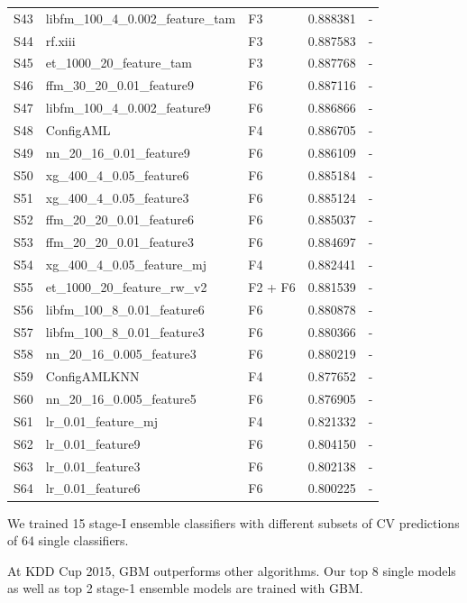\begin{table}[t]
\begin{center}
\begin{tabular}{lllll}
S43	& libfm\_100\_4\_0.002\_feature\_tam	& F3				& 0.888381	& - \\
S44	& rf.xiii				& F3							& 0.887583	& - \\
S45	& et\_1000\_20\_feature\_tam	& F3						& 0.887768	& - \\
S46 	& ffm\_30\_20\_0.01\_feature9	& F6						& 0.887116	& - \\
S47	& libfm\_100\_4\_0.002\_feature9	& F6					& 0.886866	& - \\
S48	& ConfigAML			& F4							& 0.886705	& - \\
S49	& nn\_20\_16\_0.01\_feature9	& F6						& 0.886109	& - \\
S50 	& xg\_400\_4\_0.05\_feature6	& F6						& 0.885184	& - \\
S51 	& xg\_400\_4\_0.05\_feature3	& F6						& 0.885124	& - \\
S52 	& ffm\_20\_20\_0.01\_feature6	& F6						& 0.885037	& - \\
S53	& ffm\_20\_20\_0.01\_feature3	& F6						& 0.884697	& - \\
S54 	& xg\_400\_4\_0.05\_feature\_mj	& F4					& 0.882441	& - \\
S55	& et\_1000\_20\_feature\_rw\_v2	& F2 + F6				& 0.881539	& - \\
S56	& libfm\_100\_8\_0.01\_feature6	& F6					& 0.880878	& - \\
S57	& libfm\_100\_8\_0.01\_feature3	& F6					& 0.880366	& - \\
S58	& nn\_20\_16\_0.005\_feature3	& F6						& 0.880219	& - \\
S59	& ConfigAMLKNN		& F4							& 0.877652	& - \\
S60	& nn\_20\_16\_0.005\_feature5	& F6						& 0.876905	& - \\
S61	& lr\_0.01\_feature\_mj		& F4						& 0.821332	& - \\
S62	& lr\_0.01\_feature9		& F6							& 0.804150	& - \\
S63	& lr\_0.01\_feature3		& F6							& 0.802138	& - \\
S64	& lr\_0.01\_feature6		& F6							& 0.800225	& - \\
\end{tabular}
\end{center}
\end{table}

We trained 15 stage-I ensemble classifiers with different subsets of CV predictions of 64 single classifiers.

At KDD Cup 2015, GBM outperforms other algorithms.  Our top 8 single models as well as top 2 stage-1 ensemble models are trained with GBM.


